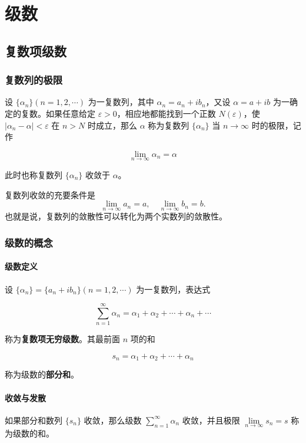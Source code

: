 \section{级数}
\label{级数}
\subsection{复数项级数}
\label{复数项级数}
\subsubsection{复数列的极限}
\label{复数列的极限}
设 \(\{\alpha_n\} (n=1,2,\cdots)\) 为一复数列，其中
\(\alpha_n = a_n + ib_n\)，又设 \(\alpha = a + ib\)
为一确定的复数。如果任意给定 \(\varepsilon > 0\)，相应地都能找到一个正数
\(N(\varepsilon)\)，使 \(|\alpha_n - \alpha| < \varepsilon\) 在
\(n > N\) 时成立，那么 \(\alpha\) 称为复数列 \(\{\alpha_n\}\) 当
\(n \to \infty\) 时的极限，记作

\[
\lim_{n \to \infty} \alpha_n = \alpha
\]

此时也称复数列 \(\{\alpha_n\}\) 收敛于 \(\alpha\)。

\begin{tcolorbox}[title={Note},colback=red!5!white
,colframe=red!75!black
,colbacktitle=yellow!50!red
,coltitle=red!25!black, fonttitle=\bfseries,subtitle style={boxrule=0.4pt, colback=yellow!50!red!25!white}]
复数列收敛的充要条件是
\[
\boxed{\lim_{n\to \infty}a_n=a,\quad \lim_{n\to \infty}b_n=b.}
\]
也就是说，复数列的敛散性可以转化为两个实数列的敛散性。

\end{tcolorbox}
\subsubsection{级数的概念}
\label{级数的概念}
\paragraph{级数定义}
\label{级数定义}
设 \(\{\alpha_n\} = \{a_n + ib_n\} (n=1,2,\cdots)\) 为一复数列，表达式

\[
\sum_{n=1}^{\infty} \alpha_n = \alpha_1 + \alpha_2 + \cdots + \alpha_n + \cdots
\]

称为\textbf{复数项无穷级数}。其最前面 \(n\) 项的和

\[
s_n = \alpha_1 + \alpha_2 + \cdots + \alpha_n
\]

称为级数的\textbf{部分和}。
\paragraph{收敛与发散}
\label{收敛与发散}
如果部分和数列 \(\{s_{n}\}\) 收敛，那么级数
\(\sum\limits_{n=1}^{\infty}\alpha_{n}\) 收敛，并且极限
\(\lim\limits_{n\to\infty}s_{n}=s\) 称为级数的和。


